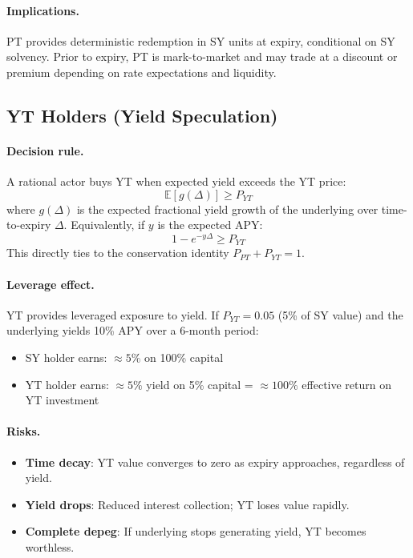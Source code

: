 \paragraph{Implications.}
PT provides deterministic redemption in SY units at expiry, conditional on SY solvency. Prior to expiry, PT is mark-to-market and may trade at a discount or premium depending on rate expectations and liquidity.

\subsection{YT Holders (Yield Speculation)}

\paragraph{Decision rule.}
A rational actor buys YT when expected yield exceeds the YT price:
\[
\mathbb{E}[g(\Delta)] \geq P_{YT}
\]
where $g(\Delta)$ is the expected fractional yield growth of the underlying over time-to-expiry $\Delta$. Equivalently, if $y$ is the expected APY:
\[
1 - e^{-y\Delta} \geq P_{YT}
\]
This directly ties to the conservation identity $P_{PT} + P_{YT} = 1$.

\paragraph{Leverage effect.}
YT provides leveraged exposure to yield. If $P_{YT} = 0.05$ (5\% of SY value) and the underlying yields 10\% APY over a 6-month period:
\begin{itemize}
\item SY holder earns: $\approx 5\%$ on 100\% capital
\item YT holder earns: $\approx 5\%$ yield on 5\% capital = $\approx 100\%$ effective return on YT investment
\end{itemize}

\paragraph{Risks.}
\begin{itemize}
\item \textbf{Time decay}: YT value converges to zero as expiry approaches, regardless of yield.
\item \textbf{Yield drops}: Reduced interest collection; YT loses value rapidly.
\item \textbf{Complete depeg}: If underlying stops generating yield, YT becomes worthless.
\end{itemize}

